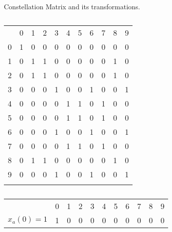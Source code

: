 \documentclass[conference]{IEEEtran}
\begin{document}
\begin{table*}
\renewcommand{\arraystretch}{1.2}
\centering
\caption{Constellation Matrix and its transformations.}
\begin{subtable}[b]{0.45\linewidth}
\hspace{4em}
	\begin{tabular}{c|c|c|c|c|c|c|c|c|c|c|}
	\multicolumn{1}{c}{}  &  \multicolumn{1}{c}{0} & \multicolumn{1}{c}{1} & 
	\multicolumn{1}{c}{2} &  \multicolumn{1}{c}{3} & \multicolumn{1}{c}{4} & 
	\multicolumn{1}{c}{5} &  \multicolumn{1}{c}{6} & \multicolumn{1}{c}{7} & 
	\multicolumn{1}{c}{8} &  \multicolumn{1}{c}{9} \\ \cline{2-11}
	0 & 1 & 0 & 0 & 0 & 0 & 0 & 0 & 0 & 0 & 0 \\ \cline{2-11}
	1 & 0 & 1 & 1 & 0 & 0 & 0 & 0 & 0 & 1 & 0 \\ \cline{2-11}
	2 & 0 & 1 & 1 & 0 & 0 & 0 & 0 & 0 & 1 & 0 \\ \cline{2-11}
	3 & 0 & 0 & 0 & 1 & 0 & 0 & 1 & 0 & 0 & 1 \\ \cline{2-11}
	4 & 0 & 0 & 0 & 0 & 1 & 1 & 0 & 1 & 0 & 0 \\ \cline{2-11}
	5 & 0 & 0 & 0 & 0 & 1 & 1 & 0 & 1 & 0 & 0 \\ \cline{2-11}
	6 & 0 & 0 & 0 & 1 & 0 & 0 & 1 & 0 & 0 & 1 \\ \cline{2-11}
	7 & 0 & 0 & 0 & 0 & 1 & 1 & 0 & 1 & 0 & 0 \\ \cline{2-11}
	8 & 0 & 1 & 1 & 0 & 0 & 0 & 0 & 0 & 1 & 0 \\ \cline{2-11}
	9 & 0 & 0 & 0 & 1 & 0 & 0 & 1 & 0 & 0 & 1 \\ \cline{2-11}
	\multicolumn{1}{c}{} & \multicolumn{1}{c}{} & \multicolumn{1}{c}{} & \multicolumn{1}{c}{} & \multicolumn{1}{c}{} & \multicolumn{1}{c}{} & \multicolumn{1}{c}{} & \multicolumn{1}{c}{} \\
	\end{tabular}	
	\caption{}
	\label{table:mat1}
\end{subtable}
\hspace{2em}
\begin{subtable}[b]{0.45\linewidth}
	\begin{tabular}{c|c|c|c|c|c|c|c|c|c|c|}
	\multicolumn{1}{c}{}  &  \multicolumn{1}{c}{0} & \multicolumn{1}{c}{1} & 
	\multicolumn{1}{c}{2} &  \multicolumn{1}{c}{3} & \multicolumn{1}{c}{4} & 
	\multicolumn{1}{c}{5} &  \multicolumn{1}{c}{6} & \multicolumn{1}{c}{7} & 
	\multicolumn{1}{c}{8} &  \multicolumn{1}{c}{9} \\ \cline{2-11}
	{\color{red} $x_{a}(0)=1$} & {\color{red} 1} & {\color{red} 0} & {\color{red} 0} & {\color{red} 0} & {\color{red} 0} & {\color{red} 0} & {\color{red} 0} & {\color{red} 0} & {\color{red} 0} & {\color{red} 0} \\ \cline{2-11}

\end{tabular}
\end{subtable}
\end{table*}
\end{document}
